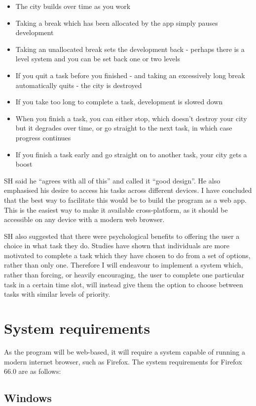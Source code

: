 \documentclass{article}
\begin{document}
\begin{itemize}
\item The city builds over time as you work
\item Taking a break which has been allocated by the app simply pauses
  development
\item Taking an unallocated break sets the development back - perhaps there is a
  level system and you can be set back one or two levels
\item If you quit a task before you finished - and taking an excessively long
  break automatically quits - the city is destroyed
\item If you take too long to complete a task, development is slowed down
\item When you finish a task, you can either stop, which doesn't destroy your
  city but it degrades over time, or go straight to the next task, in which case
  progress continues
\item If you finish a task early and go straight on to another task, your city
  gets a boost
\end{itemize}

SH said he ``agrees with all of this'' and called it ``good design''. He also
emphasised his desire to access his tasks across different devices. I have
concluded that the best way to facilitate this would be to build the program as
a web app. This is the easiest way to make it available cross-platform, as it
should be accessible on any device with a modern web browser.

SH also suggested that there were psychological benefits to offering the user a
choice in what task they do. Studies have shown that individuals are more
motivated to complete a task which they have chosen to do from a set of options,
rather than only one. Therefore I will endeavour to implement a system which,
rather than forcing, or heavily encouraging, the user to complete one particular
task in a certain time slot, will instead give them the option to choose between
tasks with similar levels of priority.

\section{System requirements}
As the program will be web-based, it will require a system capable of running a
modern internet browser, such as Firefox. The system requirements for Firefox
66.0 are as follows:

\subsection*{Windows}\label{windows}
\end{document}
